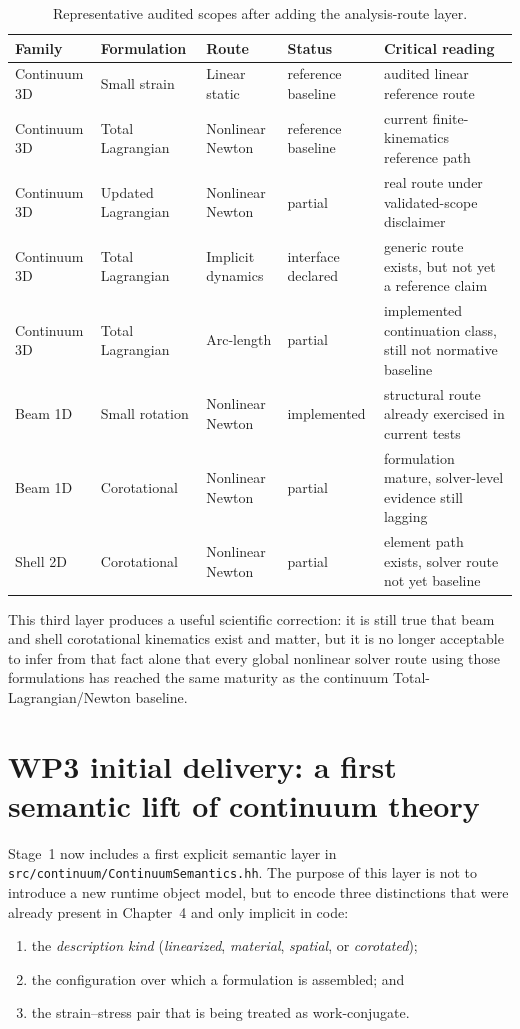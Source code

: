 \begin{table}[htbp]
  \centering
  \caption{Representative audited scopes after adding the analysis-route layer.}
  \label{tab:stage1-family-formulation-route-audit}
  \small
  \begin{tabular}{@{}lllll@{}}
    \toprule
    \textbf{Family} & \textbf{Formulation} & \textbf{Route} & \textbf{Status}
    & \textbf{Critical reading} \\
    \midrule
    Continuum 3D & Small strain & Linear static & reference baseline
    & audited linear reference route \\
    Continuum 3D & Total Lagrangian & Nonlinear Newton & reference baseline
    & current finite-kinematics reference path \\
    Continuum 3D & Updated Lagrangian & Nonlinear Newton & partial
    & real route under validated-scope disclaimer \\
    Continuum 3D & Total Lagrangian & Implicit dynamics & interface declared
    & generic route exists, but not yet a reference claim \\
    Continuum 3D & Total Lagrangian & Arc-length & partial
    & implemented continuation class, still not normative baseline \\
    Beam 1D & Small rotation & Nonlinear Newton & implemented
    & structural route already exercised in current tests \\
    Beam 1D & Corotational & Nonlinear Newton & partial
    & formulation mature, solver-level evidence still lagging \\
    Shell 2D & Corotational & Nonlinear Newton & partial
    & element path exists, solver route not yet baseline \\
    \bottomrule
  \end{tabular}
\end{table}

This third layer produces a useful scientific correction: it is still true
that beam and shell corotational kinematics exist and matter, but it is no
longer acceptable to infer from that fact alone that every global nonlinear
solver route using those formulations has reached the same maturity as the
continuum Total-Lagrangian/Newton baseline.

\section{WP3 initial delivery: a first semantic lift of continuum theory}

Stage~1 now includes a first explicit semantic layer in
\texttt{src/continuum/ContinuumSemantics.hh}.  The purpose of this layer is not
to introduce a new runtime object model, but to encode three distinctions that
were already present in Chapter~4 and only implicit in code:
\begin{enumerate}
  \item the \emph{description kind} (\emph{linearized}, \emph{material},
  \emph{spatial}, or \emph{corotated});
  \item the configuration over which a formulation is assembled; and
  \item the strain--stress pair that is being treated as work-conjugate.
\end{enumerate}

